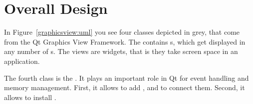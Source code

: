\section{Overall Design}

In Figure~\ref{graphicsview:uml} you see four classes depicted in grey,
that come from the Qt Graphics View Framework. The 
contains s, which get displayed in any number
of s. The views are widgets, that is they take screen space
in an application.

The fourth class is the . It plays an important role in Qt for
event handling and memory management. First, it allows to add , and to connect them.  Second, it allows to install .


